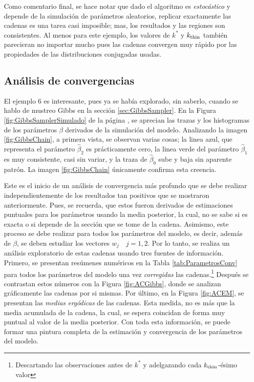 \documentclass[../Main/Main.tex]{subfiles}
\begin{document}
Como comentario final, se hace notar que dado el algoritmo es \textit{estocástico} y depende de la simulación de parámetros aleatorios, replicar exactamente las cadenas es una tarea casi imposible; mas, los resultados y las regiones son consistentes. Al menos para este ejemplo, los valores de $k^*$ y $k_{\text{thin}}$ también parecieran no importar mucho pues las cadenas convergen muy rápido por las propiedades de las distribuciones conjugadas usadas. 

\subsection{Análisis de convergencias} \label{sec:AnalisisConv}
El ejemplo 6 es interesante, pues ya se había explorado, sin saberlo, cuando se hablo de mustreo Gibbs en la sección \ref{sec:GibbsSampler}. En la Figura \ref{fig:GibbsSamplerSimulado} de la página \pageref{fig:GibbsSamplerSimulado}, se aprecian las trazas y los histogramas de los parámetros $\beta$ derivados de la simulación del modelo. Analizando la imagen \ref{fig:GibbsChain}, a primera vista, se observan varias cosas; la linea azul, que representa el parámetro $\hat{\beta}_2$ es prácticamente cero, la linea verde del parámetro $\hat{\beta}_1$ es muy consistente, casi sin variar, y la traza de $\hat{\beta}_0$ sube y baja sin aparente patrón. La imagen \ref{fig:GibbsChain} únicamente confirma esta creencia.

Este es el inicio de un análisis de convergencia más profundo que se debe realizar independientemente de los resultados tan positivos que se mostraron anteriormente. Pues, se recuerda, que estos fueron derivados de estimaciones puntuales para los parámetros usando la media posterior, la cual, no se sabe si es exacta o si depende de la sección que se tome de la cadena. Asimismo, este proceso se debe realizar para todos los parámetros del modelo, es decir, además de $\beta$, se deben estudiar los vectores $w_j \quad j = 1,2$. Por lo tanto, se realiza un análisis exploratorio de estas cadenas usando tres fuentes de información. Primero, se presentan resúmenes numéricos en la Tabla \ref{tab:ParametrosConv} para todos los parámetros del modelo una vez \textit{corregidas} las cadenas.\footnote{Descartando las observaciones antes de $k^*$ y adelgazando cada $k_{\text{thin}}$-ésimo valor} Después se contrastan estos números con la Figura \ref{fig:ACGibbs}, donde se  analizan gráficamente las cadenas por si mismas. Por último, en la Figura \ref{fig:ACEM}, se presentan las \textit{medias ergódicas} de las cadenas. Esta medida, no es más que la media acumulada de la cadena, la cual, se espera coincidan de forma muy puntual al valor de la media posterior. Con toda esta información, se puede formar una pintura completa de la estimación y convergencia de los parámetros del modelo.
\end{document}
